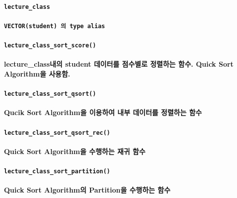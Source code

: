 \documentclass[UTF8]{report}
\begin{document}
            \paragraph{\texttt{lecture\_class}}
            \paragraph{%
                \normalfont \texttt{VECTOR(student) 의 type alias}
            }

            \paragraph{\texttt{lecture\_class\_sort\_score()}}
            \paragraph{%
                \normalfont lecture\_class내의 student 데이터를 점수별로 정렬하는 함수. Quick Sort Algorithm을 사용함.
            }


            \paragraph{\texttt{lecture\_class\_sort\_qsort()}}
            \paragraph{%
                \normalfont Qucik Sort Algorithm을 이용하여 내부 데이터를 정렬하는 함수
            }

            \paragraph{\texttt{lecture\_class\_sort\_qsort\_rec()}}
            \paragraph{%
                \normalfont Quick Sort Algorithm을 수행하는 재귀 함수
            }

            \paragraph{\texttt{lecture\_class\_sort\_partition()}}
            \paragraph{%
                \normalfont Quick Sort Algorithm의 Partition을 수행하는 함수
            }
\end{document}
